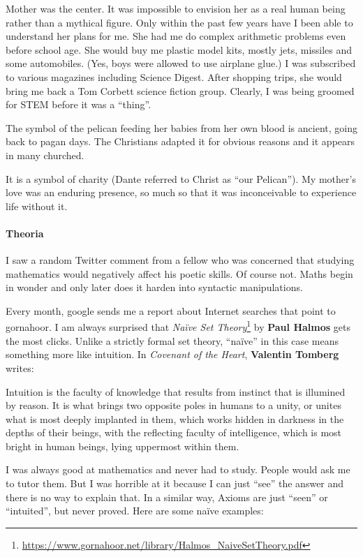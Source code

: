 Mother was the center. It was impossible to envision her as a real human being rather than a mythical figure. Only within the past few years have I been able to understand her plans for me. She had me do complex arithmetic problems even before school age. She would buy me plastic model kits, mostly jets, missiles and some automobiles. (Yes, boys were allowed to use airplane glue.) I was subscribed to various magazines including Science Digest. After shopping trips, she would bring me back a Tom Corbett science fiction group. Clearly, I was being groomed for STEM before it was a ``thing''.

The symbol of the pelican feeding her babies from her own blood is ancient, going back to pagan days. The Christians adapted it for obvious reasons and it appears in many churched.

It is a symbol of charity (Dante referred to Christ as ``our Pelican''). My mother's love was an enduring presence, so much so that it was inconceivable to experience life without it.

\paragraph{Theoria}


I saw a random Twitter comment from a fellow who was concerned that studying mathematics would negatively affect his poetic skills. Of course not. Maths begin in wonder and only later does it harden into syntactic manipulations.

Every month, google sends me a report about Internet searches that point to gornahoor. I am always surprised that \emph{Naïve Set Theory}\footnote{\url{https://www.gornahoor.net/library/Halmos_NaiveSetTheory.pdf}} by \textbf{Paul Halmos} gets the most clicks. Unlike a strictly formal set theory, ``naïve'' in this case means something more like intuition. In \emph{Covenant of the Heart}, \textbf{Valentin Tomberg} writes:

\begin{quotex}
Intuition is the faculty of knowledge that results from instinct that is illumined by reason. It is what brings two opposite poles in humans to a unity, or unites what is most deeply implanted in them, which works hidden in darkness in the depths of their beings, with the reflecting faculty of intelligence, which is most bright in human beings, lying uppermost within them.
\end{quotex}


I was always good at mathematics and never had to study. People would ask me to tutor them. But I was horrible at it because I can just ``see'' the answer and there is no way to explain that. In a similar way, Axioms are just ``seen'' or ``intuited'', but never proved. Here are some naïve examples:

